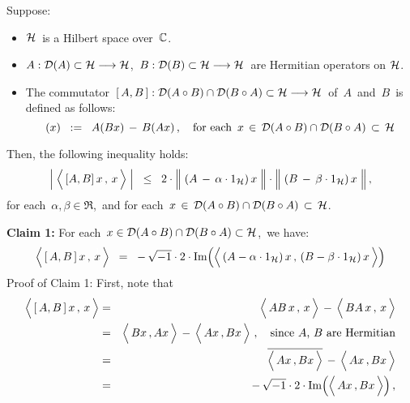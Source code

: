 \begin{theorem}
\mbox{}
\vskip 0.1cm
\noindent
Suppose:
\begin{itemize}
\item
	$\mathcal{H}$\, is a Hilbert space over \,$\mathbb{C}$.
\item
	$A : \mathcal{D}(A) \subset \mathcal{H} \longrightarrow \mathcal{H}$,\, $B : \mathcal{D}(B) \subset \mathcal{H}\longrightarrow \mathcal{H}$\,
	are Hermitian operators on $\mathcal{H}$.
\item
	The commutator
	\,$[\,A,B\,] : \mathcal{D}(A \circ B)\cap\mathcal{D}(B \circ A) \subset \mathcal{H} \longrightarrow \mathcal{H}$\,
	of \,$A$\, and \,$B$\, is defined as follows:
	\begin{equation*}
	[\,A,B\,](x)
	\;\; := \;\;
		A(Bx) \,-\, B(Ax)\,,
	\quad
	\textnormal{for each \,$x \,\in\, \D(A \circ B) \cap \D(B \circ A) \,\subset\, \H$}
	\end{equation*}
\end{itemize}
Then, the following inequality holds:
\begin{equation*}
\left\vert\; \left\langle\,[A,B]\,x\,,\,\overset{{\color{white}1}}{x}\,\right\rangle \;\right\vert
\;\; \leq \;\;
	2 \cdot
	\left\Vert\; (A \,-\, \alpha\cdot 1_{\H})\,\overset{{\color{white}1}}{x} \;\right\Vert
	\cdot
	\left\Vert\; (B \,-\, \beta\cdot 1_{\H})\,\overset{{\color{white}1}}{x} \;\right\Vert,
\end{equation*}
for each \,$\alpha, \beta \in \Re$,\, and
for each \,$x \,\in\, \mathcal{D}(A \circ B) \cap \mathcal{D}(B \circ A) \,\subset\, \mathcal{H}$.
\end{theorem}
\proof
\vskip 0.3cm
\noindent
\textbf{Claim 1:}\quad
For each \,$x \in \mathcal{D}(A \circ B)\cap\mathcal{D}(B \circ A) \subset \mathcal{H}$,\, we have:
\begin{equation*}
\left\langle\,[\,A,B\,]\,x\,,\,\overset{{\color{white}1}}{x}\,\right\rangle
\;\; = \;\;
	- \, \sqrt{-1} \cdot 2 \cdot
	\textnormal{Im}\!\left(\left\langle\,
		(A -\alpha\cdot 1_{\H})\,\overset{{\color{white}1}}{x}
		\,,\,
		(B - \beta\cdot 1_{\H})\,x
		\,\right\rangle\right)
\end{equation*}
Proof of Claim 1:\quad
First, note that
\begin{eqnarray*}
\left\langle\,[\,A,B\,]\,x\,,\,\overset{{\color{white}1}}{x}\,\right\rangle
&=&
	\left\langle\,AB\,x\,,\,\overset{{\color{white}1}}{x}\,\right\rangle
	\, - \,
	\left\langle\,BA\,x\,,\,\overset{{\color{white}1}}{x}\,\right\rangle
\\
&=&
	\left\langle\,Bx\,,A\overset{{\color{white}1}}{x}\,\right\rangle
	\, - \,
	\left\langle\,Ax\,,B\overset{{\color{white}1}}{x}\,\right\rangle\,,
	\quad
	\textnormal{since $A$, $B$ are Hermitian}
\\
&=&
	\overline{\left\langle\,Ax\,,B\overset{{\color{white}1}}{x}\,\right\rangle}
	\, - \,
	\left\langle\,Ax\,,B\overset{{\color{white}1}}{x}\,\right\rangle
\\
&=&
	-\, \sqrt{-1} \cdot 2 \cdot
	\textnormal{Im}\!\left(\left\langle\,Ax\,,B\overset{{\color{white}1}}{x}\,\right\rangle\right),
\end{eqnarray*}
